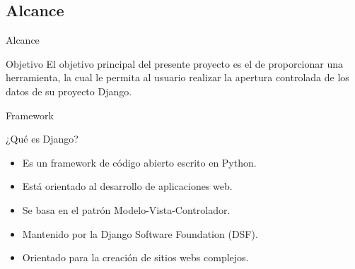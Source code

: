 \documentclass[spanish,xcolor=table,svgnames]{beamer}
\begin{document}
\subsection*{Alcance}
\begin{frame}{Alcance}
\begin{block}{Objetivo}
El objetivo principal del presente proyecto es el de proporcionar una
herramienta, la cual le permita al usuario realizar la apertura controlada de
los datos de su proyecto Django.
\end{block}
\end{frame}

\begin{frame}{Framework}
  \begin{block}{¿Qué es Django?}
  \begin{itemize}
    \item Es un framework de código abierto escrito en Python.
    \item Está orientado al desarrollo de aplicaciones web.
    \item Se basa en el patrón Modelo-Vista-Controlador.
    \item Mantenido por la Django Software Foundation (DSF).
    \item Orientado para la creación de sitios webs complejos.
  \end{itemize}
  \end{block}



\end{frame}
\end{document}

